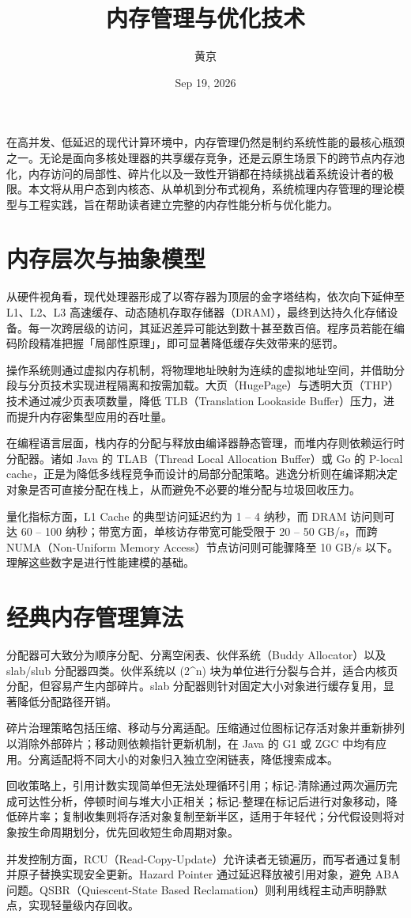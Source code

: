 \title{内存管理与优化技术}
\author{黄京}
\date{Sep 19, 2026}
\maketitle
在高并发、低延迟的现代计算环境中，内存管理仍然是制约系统性能的最核心瓶颈之一。无论是面向多核处理器的共享缓存竞争，还是云原生场景下的跨节点内存池化，内存访问的局部性、碎片化以及一致性开销都在持续挑战着系统设计者的极限。本文将从用户态到内核态、从单机到分布式视角，系统梳理内存管理的理论模型与工程实践，旨在帮助读者建立完整的内存性能分析与优化能力。\par
\chapter{内存层次与抽象模型}
从硬件视角看，现代处理器形成了以寄存器为顶层的金字塔结构，依次向下延伸至 L1、L2、L3 高速缓存、动态随机存取存储器（DRAM），最终到达持久化存储设备。每一次跨层级的访问，其延迟差异可能达到数十甚至数百倍。程序员若能在编码阶段精准把握「局部性原理」，即可显著降低缓存失效带来的惩罚。\par
操作系统则通过虚拟内存机制，将物理地址映射为连续的虚拟地址空间，并借助分段与分页技术实现进程隔离和按需加载。大页（HugePage）与透明大页（THP）技术通过减少页表项数量，降低 TLB（Translation Lookaside Buffer）压力，进而提升内存密集型应用的吞吐量。\par
在编程语言层面，栈内存的分配与释放由编译器静态管理，而堆内存则依赖运行时分配器。诸如 Java 的 TLAB（Thread Local Allocation Buffer）或 Go 的 P-local cache，正是为降低多线程竞争而设计的局部分配策略。逃逸分析则在编译期决定对象是否可直接分配在栈上，从而避免不必要的堆分配与垃圾回收压力。\par
量化指标方面，L1 Cache 的典型访问延迟约为 1 – 4 纳秒，而 DRAM 访问则可达 60 – 100 纳秒；带宽方面，单核访存带宽可能受限于 20 – 50 GB/s，而跨 NUMA（Non-Uniform Memory Access）节点访问则可能骤降至 10 GB/s 以下。理解这些数字是进行性能建模的基础。\par
\chapter{经典内存管理算法}
分配器可大致分为顺序分配、分离空闲表、伙伴系统（Buddy Allocator）以及 slab/slub 分配器四类。伙伴系统以 (2\^{}n) 块为单位进行分裂与合并，适合内核页分配，但容易产生内部碎片。slab 分配器则针对固定大小对象进行缓存复用，显著降低分配路径开销。\par
碎片治理策略包括压缩、移动与分离适配。压缩通过位图标记存活对象并重新排列以消除外部碎片；移动则依赖指针更新机制，在 Java 的 G1 或 ZGC 中均有应用。分离适配将不同大小的对象归入独立空闲链表，降低搜索成本。\par
回收策略上，引用计数实现简单但无法处理循环引用；标记-清除通过两次遍历完成可达性分析，停顿时间与堆大小正相关；标记-整理在标记后进行对象移动，降低碎片率；复制收集则将存活对象复制至新半区，适用于年轻代；分代假设则将对象按生命周期划分，优先回收短生命周期对象。\par
并发控制方面，RCU（Read-Copy-Update）允许读者无锁遍历，而写者通过复制并原子替换实现安全更新。Hazard Pointer 通过延迟释放被引用对象，避免 ABA 问题。QSBR（Quiescent-State Based Reclamation）则利用线程主动声明静默点，实现轻量级内存回收。\par
